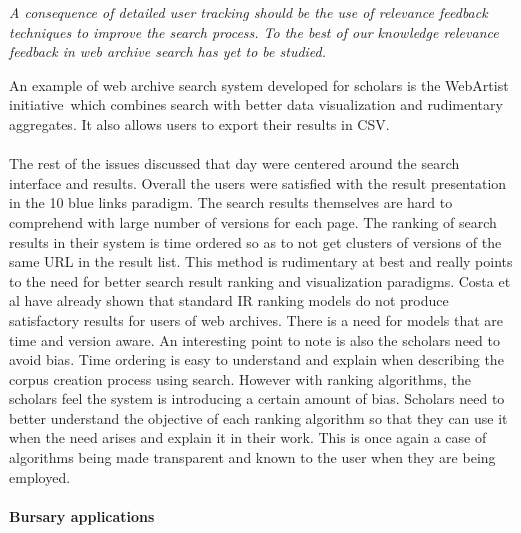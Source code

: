  \textit{A consequence of detailed user tracking should be the use of relevance feedback techniques to improve the search process. To the best of our knowledge relevance feedback in web archive search has yet to be studied.}

An example of web archive search system developed for scholars is the WebArtist initiative~\cite{huurdeman2013sprint}which combines search with better data visualization and rudimentary aggregates. It also allows users to export their results in CSV.

\paragraph{} %
\label{par:}
The rest of the issues discussed that day were centered around the search interface and results. Overall the users were satisfied with the result presentation in the 10 blue links paradigm. The search results themselves are hard to comprehend with large number of versions for each page. The ranking of search results in their system is time ordered so as to not get clusters of versions of the same URL in the result list. This method is rudimentary at best and really points to the need for better search result ranking and visualization paradigms. Costa et al \cite{costa2010understanding} have already shown that standard IR ranking models do not produce satisfactory results for users of web archives. There is a need for models that are time and version aware. An interesting point to note is also the scholars need to avoid bias. Time ordering is easy to understand and explain when describing the corpus creation process using search. However with ranking algorithms, the scholars feel the system is introducing a certain amount of bias. Scholars need to better understand the objective of each ranking algorithm so that they can use it when the need arises and explain it in their work. This is once again a case of algorithms being made transparent and known to the user when they are being employed. 

\paragraph{Bursary applications} %
\label{par:bursary_applications}

